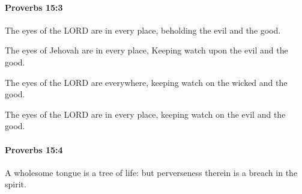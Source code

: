		\paragraph{Proverbs 15:3} %
			\label{PROVERBS-15-3}

			The eyes of the LORD are in every place, beholding the evil and the good.

			\begin{versebox}
					\item[BHS] 
					\item[ASV] The eyes of Jehovah are in every place, Keeping watch upon the evil and the good.
					\item[NIV] The eyes of the LORD are everywhere, keeping watch on the wicked and the good.
					\item[NRSV] The eyes of the LORD are in every place, keeping watch on the evil and the good.
			\end{versebox}

		\paragraph{Proverbs 15:4} %
			\label{PROVERBS-15-4}

			A wholesome tongue is a tree of life: but perverseness therein is a breach in the spirit.

